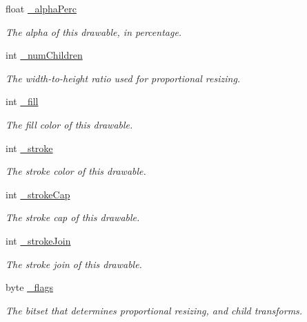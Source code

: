 \begin{DoxyCompactItemize}
float \hyperlink{classhype_1_1core_1_1drawable_1_1_h_drawable_a7567622bf145f03bc8897e9e399c2051}{\-\_\-alpha\-Perc}
\begin{DoxyCompactList}\small\item\em The alpha of this drawable, in percentage. \end{DoxyCompactList}\item 
int \hyperlink{classhype_1_1core_1_1drawable_1_1_h_drawable_a3d2ec798d880968b25a5c81a8dd31357}{\-\_\-num\-Children}
\begin{DoxyCompactList}\small\item\em The width-\/to-\/height ratio used for proportional resizing. \end{DoxyCompactList}\item 
int \hyperlink{classhype_1_1core_1_1drawable_1_1_h_drawable_a5f07bd6382bd895ca51c51a2285a31dc}{\-\_\-fill}
\begin{DoxyCompactList}\small\item\em The fill color of this drawable. \end{DoxyCompactList}\item 
int \hyperlink{classhype_1_1core_1_1drawable_1_1_h_drawable_aa773c8e474774a4f4b6437f77abdc85b}{\-\_\-stroke}
\begin{DoxyCompactList}\small\item\em The stroke color of this drawable. \end{DoxyCompactList}\item 
int \hyperlink{classhype_1_1core_1_1drawable_1_1_h_drawable_a35be29f7a889fada5549c5dfcaa98d7d}{\-\_\-stroke\-Cap}
\begin{DoxyCompactList}\small\item\em The stroke cap of this drawable. \end{DoxyCompactList}\item 
int \hyperlink{classhype_1_1core_1_1drawable_1_1_h_drawable_a3b021f60cc0552c6d1c5d4e298419dec}{\-\_\-stroke\-Join}
\begin{DoxyCompactList}\small\item\em The stroke join of this drawable. \end{DoxyCompactList}\item 
\hypertarget{classhype_1_1core_1_1drawable_1_1_h_drawable_a43f24a50f5146c4f474e94551f8ad8f1}{byte \hyperlink{classhype_1_1core_1_1drawable_1_1_h_drawable_a43f24a50f5146c4f474e94551f8ad8f1}{\-\_\-flags}}\label{classhype_1_1core_1_1drawable_1_1_h_drawable_a43f24a50f5146c4f474e94551f8ad8f1}

\begin{DoxyCompactList}\small\item\em The bitset that determines proportional resizing, and child transforms. \end{DoxyCompactList}\end{DoxyCompactItemize}


